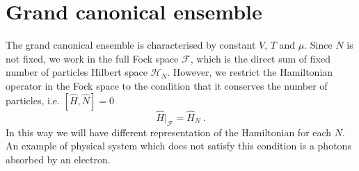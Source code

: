 \section{Grand canonical ensemble}

    The grand canonical ensemble is characterised by constant $V$, $T$ and $\mu$. Since $N$ is not fixed, we work in the full Fock space $\mathcal F$, which is the direct sum of fixed number of particles Hilbert space $\mathcal H_N$. However, we restrict the Hamiltonian operator in the Fock space to the condition that it conserves the number of particles, i.e. $[\hat H, \hat N] = 0$ 
    \begin{equation*}
        \hat H \Big \vert_{\mathcal F} = \hat H_N ~.
    \end{equation*}
    In this way we will have different representation of the Hamiltonian for each $N$. An example of physical system which does not satisfy this condition is a photons absorbed by an electron. 

